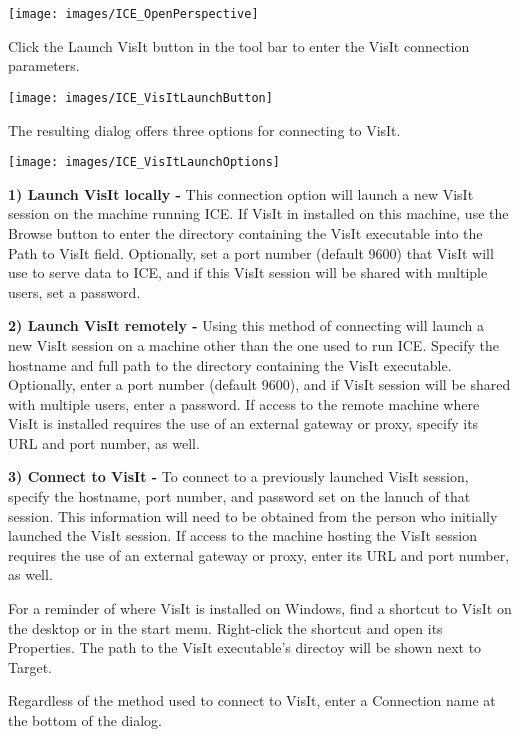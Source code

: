 \begin{center}
\texttt{[image: images/ICE\_OpenPerspective]}
\end{center}

Click the Launch VisIt button in the tool bar to enter the VisIt connection
parameters.

\begin{center}
\texttt{[image: images/ICE\_VisItLaunchButton]}
\end{center}

The resulting dialog offers three options for connecting to VisIt.

\begin{center}
\texttt{[image: images/ICE\_VisItLaunchOptions]}
\end{center}

\textbf{1) Launch VisIt locally -} This connection option will launch a new
VisIt session on the machine running ICE. If VisIt in installed on this machine,
use the Browse button to enter the directory containing the VisIt executable
into the Path to VisIt field. Optionally, set a port number (default 9600) that
VisIt will use to serve data to ICE, and if this VisIt session will be shared
with multiple users, set a password.

\textbf{2) Launch VisIt remotely -} Using this method of connecting will launch
a new VisIt session on a machine other than the one used to run ICE. Specify the
hostname and full path to the directory containing the VisIt executable.
Optionally, enter a port number (default 9600), and if VisIt session will be
shared with multiple users, enter a password. If access to the remote machine
where VisIt is installed requires the use of an external gateway or proxy,
specify its URL and port number, as well.

\textbf{3) Connect to VisIt -} To connect to a previously launched VisIt
session, specify the hostname, port number, and password set on the lanuch of
that session. This information will need to be obtained from the person who
initially launched the VisIt session. If access to the machine hosting the VisIt
session requires the use of an external gateway or proxy, enter its URL and port
number, as well.

For a reminder of where VisIt is installed on Windows, find a shortcut to
VisIt on the desktop or in the start menu. Right-click the shortcut and open its
Properties. The path to the VisIt executable's directoy will be shown next to
Target.

Regardless of the method used to connect to VisIt, enter a Connection
name at the bottom of the dialog. 

